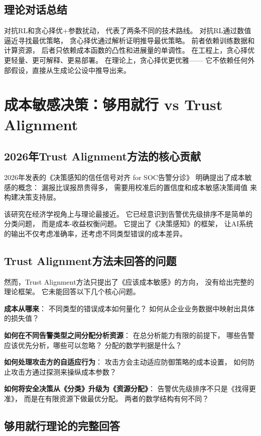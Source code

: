 \documentclass[11pt,a4paper]{article}
\begin{document}
\subsection{理论对话总结}

对抗RL和贪心择优+参数扰动，
代表了两条不同的技术路线。
对抗RL通过数值逼近寻找最优策略，
贪心择优通过解析证明推导最优策略。
前者依赖训练数据和计算资源，
后者只依赖成本函数的凸性和进展量的单调性。
在工程上，贪心择优更轻量、更可解释、更易部署。
在理论上，贪心择优更优雅——
它不依赖任何外部假设，直接从生成论公设中推导出来。

\section{成本敏感决策：够用就行 vs Trust Alignment}

\subsection{2026年Trust Alignment方法的核心贡献}

2026年发表的《决策感知的信任信号对齐 for SOC告警分诊》
明确提出了成本敏感的概念：
漏报比误报昂贵得多，
需要用校准后的置信度和成本敏感决策阈值
来构建决策支持层。

该研究在经济学视角上与理论最接近。
它已经意识到告警优先级排序不是简单的分类问题，
而是成本-收益权衡问题。
它提出了《决策感知》的框架，
让AI系统的输出不仅考虑准确率，还考虑不同类型错误的成本差异。

\subsection{Trust Alignment方法未回答的问题}

然而，Trust Alignment方法只提出了《应该成本敏感》的方向，
没有给出完整的理论框架。
它未能回答以下几个核心问题。

\textbf{成本从哪来}：
不同类型的错误成本如何量化？
如何从企业业务数据中映射出具体的损失值？

\textbf{如何在不同告警类型之间分配分析资源}：
在总分析能力有限的前提下，
哪些告警应该优先分析，哪些可以忽略？
分配的数学判据是什么？

\textbf{如何处理攻击方的自适应行为}：
攻击方会主动适应防御策略的成本设置，
如何防止攻击方通过探测来操纵成本参数？

\textbf{如何将安全决策从《分类》升级为《资源分配》}：
告警优先级排序不只是《找得更准》，
而是在有限资源下做最优分配。
两者的数学结构有何不同？

\subsection{够用就行理论的完整回答}
\end{document}
